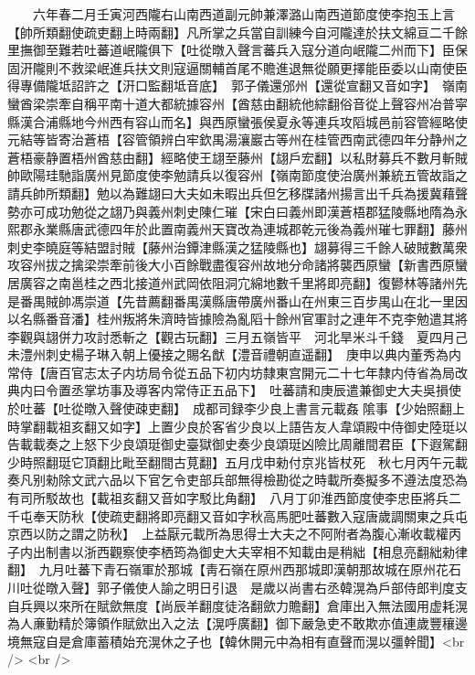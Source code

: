 　　六年春二月壬寅河西隴右山南西道副元帥兼澤潞山南西道節度使李抱玉上言【帥所類翻使疏吏翻上時兩翻】凡所掌之兵當自訓練今自河隴達於扶文綿亘二千餘里撫御至難若吐蕃道岷隴俱下【吐從暾入聲言蕃兵入寇分道向岷隴二州而下】臣保固汧隴則不救梁岷進兵扶文則寇逼關輔首尾不贍進退無從願更擇能臣委以山南使臣得專備隴坻詔許之【汧口監翻坻音底】　郭子儀還邠州【還從宣翻又音如字】　嶺南蠻酋梁崇牽自稱平南十道大都統據容州【酋慈由翻統他綜翻俗音從上聲容州冶普寜縣漢合浦縣地今州西有容山而名】與西原蠻張侯夏永等連兵攻䧟城邑前容管經略使元結等皆寄治蒼梧【容管領辨白牢欽禺湯瀼巖古等州在桂管西南武德四年分静州之蒼梧豪静置梧州酋慈由翻】經略使王翃至藤州【翃戶宏翻】以私財募兵不數月斬賊帥歐陽珪馳詣廣州見節度使李勉請兵以復容州【嶺南節度使治廣州兼統五管故詣之請兵帥所類翻】勉以為難翃曰大夫如未暇出兵但乞移牒諸州揚言出千兵為援冀藉聲勢亦可成功勉從之翃乃與義州刺史陳仁璀【宋白曰義州即漢蒼梧郡猛陵縣地隋為永熙郡永業縣唐武德四年於此置南義州天寶改為連城郡乾元後為義州璀七罪翻】藤州刺史李曉庭等結盟討賊【藤州治鐔津縣漢之猛陵縣也】翃募得三千餘人破賊數萬衆攻容州拔之擒梁崇牽前後大小百餘戰盡復容州故地分命諸將襲西原蠻【新書西原蠻居廣容之南邕桂之西北接道州武岡依阻洞宂綿地數千里將即亮翻】復鬰林等諸州先是番禺賊帥馮崇道【先昔薦翻番禺漢縣唐帶廣州番山在州東三百步禺山在北一里因以名縣番音潘】桂州叛將朱濟時皆據險為亂䧟十餘州官軍討之連年不克李勉遣其將李觀與翃併力攻討悉斬之【觀古玩翻】三月五嶺皆平　河北旱米斗千錢　夏四月己未澧州刺史楊子琳入朝上優接之賜名猷【澧音禮朝直遥翻】　庚申以典内董秀為内常侍【唐百官志太子内坊局令從五品下初内坊隸東宫開元二十七年隸内侍省為局改典内曰令置丞掌坊事及導客内常侍正五品下】　吐蕃請和庚辰遣兼御史大夫吳損使於吐蕃【吐從暾入聲使疎吏翻】　成都司録李少良上書言元載姦隂事【少始照翻上時掌翻載祖亥翻又如字】上置少良於客省少良以上語告友人韋頌殿中侍御史陸珽以告載載奏之上怒下少良頌珽御史臺獄御史奏少良頌珽凶險比周離間君臣【下遐駕翻少時照翻珽它頂翻比毗至翻間古莧翻】五月戊申勑付京兆皆杖死　秋七月丙午元載奏凡别勑除文武六品以下官乞令吏部兵部無得檢勘從之時載所奏擬多不遵法度恐為有司所駁故也【載祖亥翻又音如字駁比角翻】　八月丁卯淮西節度使李忠臣將兵二千屯奉天防秋【使疏吏翻將即亮翻又音如字秋高馬肥吐蕃數入寇唐歲調關東之兵屯京西以防之謂之防秋】　上益厭元載所為思得士大夫之不阿附者為腹心漸收載權丙子内出制書以浙西觀察使李栖筠為御史大夫宰相不知載由是稍絀【相息亮翻絀勑律翻】　九月吐蕃下青石嶺軍於那城【靑石嶺在原州西那城即漢朝那故城在原州花石川吐從暾入聲】郭子儀使人諭之明日引退　是歲以尚書右丞韓滉為戶部侍郎判度支自兵興以來所在賦歛無度【尚辰羊翻度徒洛翻歛力贍翻】倉庫出入無法國用虚耗滉為人亷勤精於簿領作賦歛出入之法【滉呼廣翻】御下嚴急吏不敢欺亦值連歲豐穰邊境無寇自是倉庫蓄積始充滉休之子也【韓休開元中為相有直聲而滉以彊幹聞】<br />
<br />

